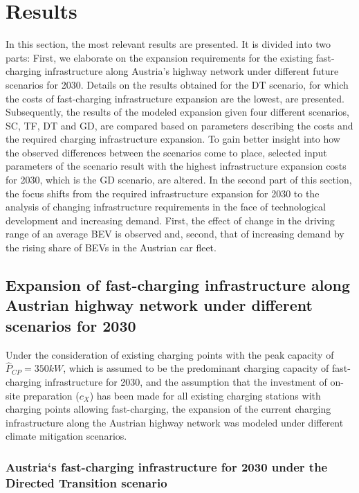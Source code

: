 \documentclass[journal,article,submit,pdftex,moreauthors]{Definitions/mdpi}
\begin{document}

\section{Results}
In this section, the most relevant results are presented. It is divided into two parts: First, we elaborate on the expansion requirements for the existing fast-charging infrastructure along Austria's highway network under different future scenarios for 2030. Details on the results obtained for the DT scenario, for which the costs of fast-charging infrastructure expansion are the lowest, are presented. Subsequently, the results of the modeled expansion given four different scenarios, SC, TF, DT and GD, are compared based on parameters describing the costs and the required charging infrastructure expansion. To gain better insight into how the observed differences between the scenarios come to place,  selected input parameters of the scenario result with the highest infrastructure expansion costs for 2030, which is the GD scenario, are altered. In the second part of this section, the focus shifts from the required infrastructure expansion for 2030 to the analysis of changing infrastructure requirements in the face of technological development and increasing demand. First, the effect of change in the driving range of an average BEV is observed and, second, that of increasing demand by the rising share of BEVs in the Austrian car fleet. 


\subsection{Expansion of fast-charging infrastructure along Austrian highway network under different scenarios for 2030}

Under the consideration of existing charging points with the peak capacity of $\hat{P}_{CP} = 350kW$, which is assumed to be the predominant charging capacity of fast-charging infrastructure for 2030, and the assumption that the investment of on-site preparation ($c_X$) has been made for all existing charging stations with charging points allowing fast-charging, the expansion of the current charging infrastructure along the Austrian highway network was modeled under different climate mitigation scenarios. 

\subsubsection{Austria`s fast-charging infrastructure for 2030 under the Directed Transition scenario}
\end{document}
